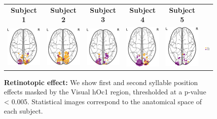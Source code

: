 \begin{figure}[ht]
\scriptsize
\vspace{2ex}
\hspace{-4ex}
\begin{tabular}{cccccl}
\textbf{\Large Subject 1} & \textbf{\Large Subject 2} & \textbf{\Large Subject 3} & \textbf{\Large Subject 4} & \textbf{\Large Subject 5} & {}\\
{\includegraphics[width=.13\linewidth]{figures/part_II/retinotopy_01.pdf}}
\hspace{1ex}
&{\includegraphics[width=.13\linewidth]{figures/part_II/retinotopy_03.pdf}}
\hspace{1ex}
&{\includegraphics[width=.13\linewidth]{figures/part_II/retinotopy_04.pdf}}
\hspace{1ex}
&{\includegraphics[width=.13\linewidth]{figures/part_II/retinotopy_05.pdf}}
\hspace{1ex}
&{\includegraphics[width=.13\linewidth]{figures/part_II/retinotopy_06.pdf}}
\hspace{-1ex}
&{\includegraphics[width=.12\linewidth]{figures/part_II/retinotopy_legend.pdf}}
\hspace{-1ex} \\
\end{tabular}
\vspace{3ex}
\caption{\textbf{Retinotopic effect:} We show first and second syllable position effects masked by the Visual hOc1 region, thresholded at a p-value < 0.005.
Statistical images correspond to the anatomical space of each subject.}
\label{fig:retinotopy}
\end{figure}


